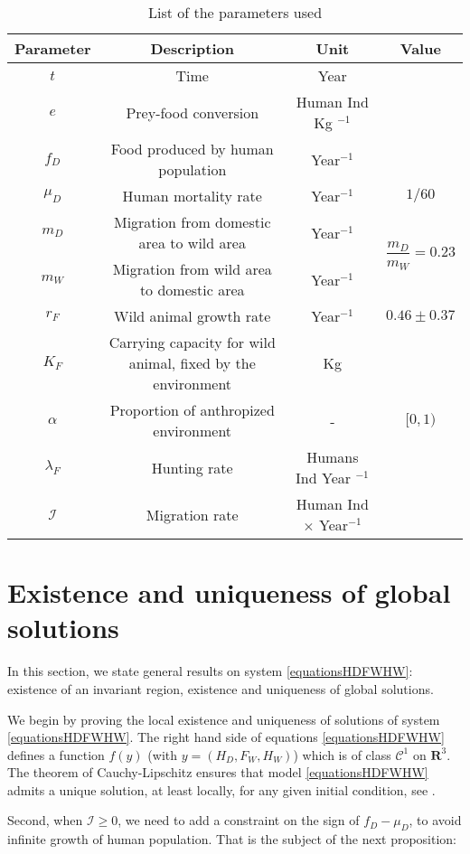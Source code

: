 \documentclass{article}
\newcommand{\lfw}{\lambda_{F}}
\newcommand{\lfw}{\lambda_{F}}
\newcommand{\cI}{\mathcal{I}}
\begin{document}
\begin{table}
\centering
\begin{tabular}{|c|c|c|c|}
\hline 
Parameter & Description & Unit & Value \\ 
\hline 
$t$ & Time & Year \\
$e$ & Prey-food conversion & Human Ind Kg $^{-1}$ & \\
$f_D$ & Food produced by human population & Year$^{-1}$\\
$\mu_D$ & Human mortality rate  & Year$^{-1}$ & $1/60$\\
$m_D$ & Migration from domestic area to wild area & Year$^{-1}$ & \multirow{2}{*}{$\dfrac{m_D}{m_W} = 0.23$}\\
$m_W$ & Migration from wild area to domestic area & Year$^{-1}$\\
$r_F$ & Wild animal growth rate & Year$^{-1}$ & $0.46 \pm 0.37$\\
$K_F$ & Carrying capacity for wild animal, fixed by the environment& Kg\\
$\alpha$ & Proportion of anthropized environment & - & $[0, 1)$\\
$\lfw$ & Hunting rate & Humans Ind Year $^{-1}$ \\
\hline
$\mathcal{I}$ & Migration rate & Human Ind $\times$ Year$^{-1}$ \\
\hline
\end{tabular}
\caption{List of the parameters used}
\end{table}

\section{Existence and uniqueness of global solutions}
In this section, we state general results on system \eqref{equationsHDFWHW}:  existence of an invariant region, existence and uniqueness of global solutions.

We begin by proving the local existence and uniqueness of solutions of system \eqref{equationsHDFWHW}. The right hand side of equations \eqref{equationsHDFWHW} defines a function $f(y)$ (with $y = (H_D, F_W, H_W)$) which is of class $\mathcal{C}^1$ on $\mathbf{R}^3$. The theorem of Cauchy-Lipschitz ensures that model \eqref{equationsHDFWHW} admits a unique solution, at least locally, for any given initial condition, see \cite{walter_ordinary_1998}.

Second, when $\cI \geq 0$, we need to add a constraint on the sign of $f_D - \mu_D$, to avoid infinite growth of human population. That is the subject of the next proposition:
\end{document}
